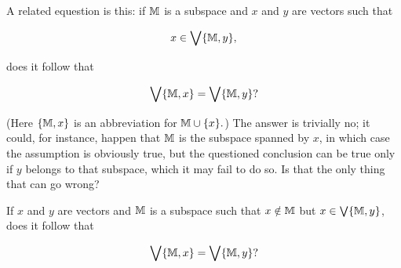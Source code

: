 A related equestion is this: if $\mathbb{M}$ is a subspace and $x$ and $y$ are vectors such that

\begin{equation}
    x \in \bigvee \{ \mathbb{M}, y\},
\end{equation}

does it follow that

\begin{equation}
    \bigvee \{\mathbb{M}, x\} = \bigvee \{\mathbb{M}, y\}?
\end{equation}

(Here $\{\mathbb{M}, x\}$ is an abbreviation for $\mathbb{M} \cup \{x\}.$) The answer is trivially no; it could, for instance, happen that $\mathbb{M}$ is the subspace spanned by $x$, in which case the assumption is obviously true, but the questioned conclusion can be true only if $y$ belongs to that subspace, which it may fail to do so. Is that the only thing that can go wrong?

\begin{problem}
If $x$ and $y$ are vectors and $\mathbb{M}$ is a subspace such that $x \notin \mathbb{M}$ but $x \in \bigvee \{\mathbb{M},y\}$, does it follow that

\begin{equation}
    \bigvee \{\mathbb{M},x\} = \bigvee \{\mathbb{M}, y\}?
\end{equation}
\end{problem}